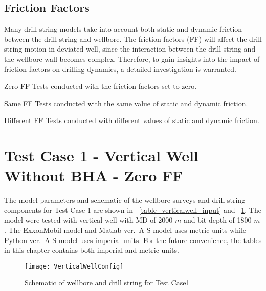 \subsection{Friction Factors}
Many drill string models take into account both static and dynamic friction between the drill string and wellbore. The friction factors (FF) will affect the drill string motion in deviated well, since the interaction between the drill string and the wellbore wall becomes complex.\wording{}  Therefore, to gain insights into the impact of friction factors on drilling dynamics, a detailed investigation is warranted.\wording{}

\begin{definition}{Zero FF}
Tests conducted with the friction factors set to zero.
\end{definition}
\begin{definition}{Same FF}
Tests conducted with the same value of static and dynamic friction.
\end{definition}
\begin{definition}{Different FF}
Tests conducted with different values of static and dynamic friction.
\end{definition}




\section{Test Case 1 - Vertical Well Without BHA - Zero FF}
The model parameters and schematic of the wellbore surveys and drill string components for Test Case 1 are shown in \tablename~\ref{table_verticalwell_input} and \figurename~\ref{figure_verticalwell}. The model were tested with vertical well with MD of 2000 $m$ and bit depth of 1800 $m$. The ExxonMobil model and Matlab ver.\ A-S model uses metric units while Python ver.\ A-S model uses imperial units. For the future convenience, the tables in this chapter contains both imperial and metric units.

\begin{figure}
  \centering
  \texttt{[image: VerticalWellConfig]}
  \caption[Schematic of wellbore and drill string for Test Case1]{Schematic of wellbore and drill string for Test Case1}\label{figure_verticalwell}
\end{figure}

